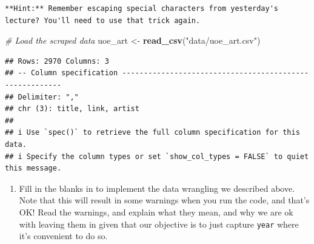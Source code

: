 \documentclass[
]{article}
\newenvironment{Shaded}{\begin{snugshade}}{\end{snugshade}}
\newcommand{\AttributeTok}[1]{\textcolor[rgb]{0.13,0.29,0.53}{#1}}
\newcommand{\CommentTok}[1]{\textcolor[rgb]{0.56,0.35,0.01}{\textit{#1}}}
\newcommand{\FunctionTok}[1]{\textcolor[rgb]{0.13,0.29,0.53}{\textbf{#1}}}
\newcommand{\NormalTok}[1]{#1}
\newcommand{\OtherTok}[1]{\textcolor[rgb]{0.56,0.35,0.01}{#1}}
\newcommand{\SpecialCharTok}[1]{\textcolor[rgb]{0.81,0.36,0.00}{\textbf{#1}}}
\newcommand{\StringTok}[1]{\textcolor[rgb]{0.31,0.60,0.02}{#1}}
\providecommand{\tightlist}{%
  \setlength{\itemsep}{0pt}\setlength{\parskip}{0pt}}
\begin{document}
\begin{verbatim}
**Hint:** Remember escaping special characters from yesterday's lecture? You'll need to use that trick again.
\end{verbatim}

\begin{Shaded}
\begin{Highlighting}[]
\CommentTok{\# Load the scraped data}
\NormalTok{uoe\_art }\OtherTok{\textless{}{-}} \FunctionTok{read\_csv}\NormalTok{(}\StringTok{"data/uoe\_art.csv"}\NormalTok{)}
\end{Highlighting}
\end{Shaded}

\begin{verbatim}
## Rows: 2970 Columns: 3
## -- Column specification --------------------------------------------------------
## Delimiter: ","
## chr (3): title, link, artist
## 
## i Use `spec()` to retrieve the full column specification for this data.
## i Specify the column types or set `show_col_types = FALSE` to quiet this message.
\end{verbatim}

\begin{enumerate}
\def\labelenumi{\arabic{enumi}.}
\setcounter{enumi}{8}
\tightlist
\item
  Fill in the blanks in to implement the data wrangling we described
  above. Note that this will result in some warnings when you run the
  code, and that's OK! Read the warnings, and explain what they mean,
  and why we are ok with leaving them in given that our objective is to
  just capture \texttt{year} where it's convenient to do so.
\end{enumerate}

\begin{Shaded}
\end{Shaded}
\end{document}
